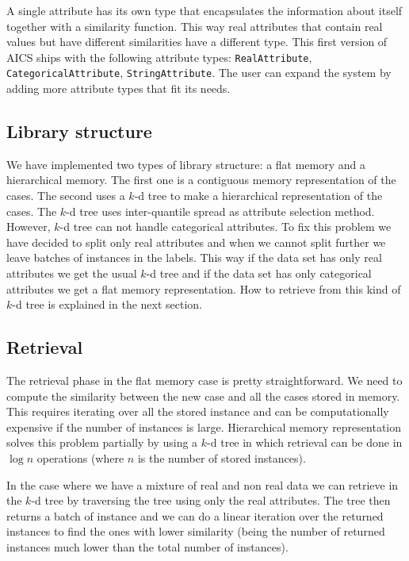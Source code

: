 \documentclass[11pt]{article}
\begin{document}
A single attribute has its own type that encapsulates the information about itself together with a similarity function. This way real attributes that contain real values but have different similarities have a different type. This first version of AICS ships with the following attribute types: \texttt{RealAttribute}, \texttt{CategoricalAttribute}, \texttt{StringAttribute}. The user can expand the system by adding more attribute types that fit its needs.

\subsection{Library structure}

We have implemented two types of library structure: a flat memory and a hierarchical memory. The first one is a contiguous memory representation of the cases. The second uses a $k$-d tree to make a hierarchical representation of the cases. The $k$-d tree uses inter-quantile spread as attribute selection method. However, $k$-d tree can not handle categorical attributes. To fix this problem we have decided to split only real attributes and when we cannot split further we leave batches of instances in the labels. This way if the data set has only real attributes we get the usual $k$-d tree and if the data set has only categorical attributes we get a flat memory representation. How to retrieve from this kind of $k$-d tree is explained in the next section.

\subsection{Retrieval}

The retrieval phase in the flat memory case is pretty straightforward. We need to compute the similarity between the new case and all the cases stored in memory. This requires iterating over all the stored instance and can be computationally expensive if the number of instances is large. Hierarchical memory representation solves this problem partially by using a $k$-d tree in which retrieval can be done in $\log n$ operations (where $n$ is the number of stored instances). 

In the case where we have a mixture of real and non real data we can retrieve in the $k$-d tree by traversing the tree using only the real attributes. The tree then returns a batch of instance and we can do a linear iteration over the returned instances to find the ones with lower similarity (being the number of returned instances much lower than the total number of instances).
\end{document}
